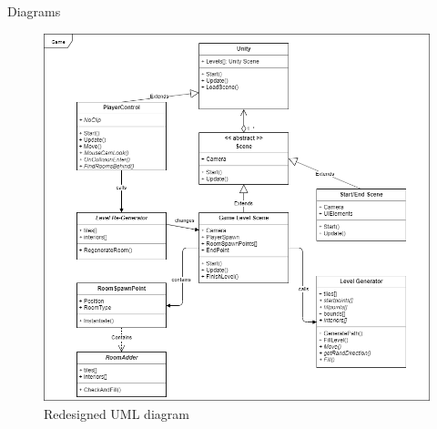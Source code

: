 \documentclass[progress]{cmpreport}
\begin{document}
\begin{section}{Diagrams}
\begin{figure}[H]
    \includegraphics[width=\textwidth]{img/uml2.png}
    \caption{Redesigned UML diagram}
    \label{fig:uml2}
\end{figure}

\end{section}
\end{document}
